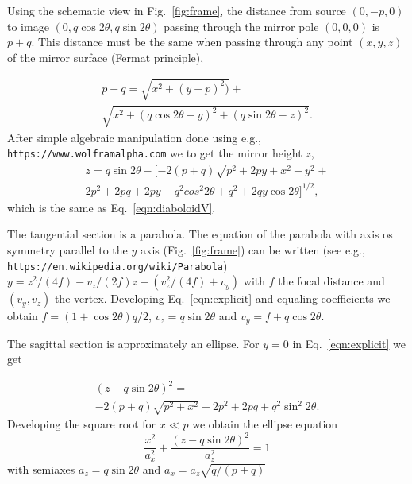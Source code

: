 \documentclass{iucr}              %
\begin{document}
Using the schematic view in Fig.~\ref{fig:frame}, the distance from source $(0,-p,0)$ to image $(0,q \cos2\theta, q \sin2\theta)$ passing through the mirror pole $(0,0,0)$ is $p+q$. This distance must be the same when passing through any point $(x,y,z)$ of the mirror surface (Fermat principle),

\begin{multline}
\label{eqn:distances}
p + q = 
\sqrt{x^2 + (y + p)^2)} + \\
\sqrt{x^2 + (q \cos2 \theta - y)^2 + (q \sin2 \theta - z)^2}.
\end{multline}
After simple algebraic manipulation done using e.g., {\tt https://www.wolframalpha.com} we to get the mirror height $z$,
\begin{multline}
\label{eqn:explicit}
z = q \sin2\theta - 
[-2 (p + q) \sqrt{p^2 + 2 p y + x^2 + y^2} + \\ 
2 p^2 +2  p q +  2 p y - q^2 cos^2 2 \theta +  q^2 + 2 q y \cos2\theta ]^{1/2},
\end{multline}
which is the same as Eq.~\ref{eqn:diaboloidV}. 

The tangential section is a parabola. The equation of the parabola with axis os symmetry parallel to the $y$ axis (Fig.~\ref{fig:frame}) can be written (see e.g., {\tt https://en.wikipedia.org/wiki/Parabola}) $y = z^2/(4 f) - v_z/(2 f) z + (v_z^2/(4 f)+ v_y)$ with $f$ the focal distance and $(v_y,v_z)$ the vertex. Developing Eq.~\ref{eqn:explicit} and equaling coefficients we obtain $f=(1+\cos2\theta)q/2$, $v_z=q \sin2\theta$ and $v_y=f+q\cos2\theta$.

The sagittal section is approximately an ellipse. For $y=0$ in Eq.~\ref{eqn:explicit} we get

\begin{multline}
\label{eqn:explicit}
(z - q \sin2\theta)^2 = \\
-2 (p + q) \sqrt{p^2 + x^2}+ 
2 p^2 +2  p q + q^2 \sin^2 2 \theta.
\end{multline}
Developing the square root for $x\ll p$ we obtain the ellipse equation
\begin{equation}
\label{eqn:ellipse}
\frac{x^2}{a_x^2} + \frac{(z-q \sin2\theta)^2}{a_z^2}=1
\end{equation}
with semiaxes $a_z=q \sin2\theta$ and $a_x=a_z\sqrt{q/(p+q)}$


\end{document}
